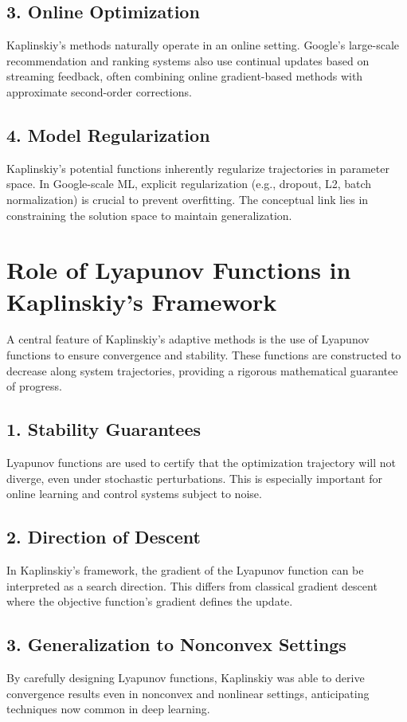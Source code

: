 \documentclass[12pt]{article}
\begin{document}
\subsection*{3. Online Optimization}
Kaplinskiy's methods naturally operate in an online setting. Google’s large-scale recommendation and ranking systems also use continual updates based on streaming feedback, often combining online gradient-based methods with approximate second-order corrections.

\subsection*{4. Model Regularization}
Kaplinskiy's potential functions inherently regularize trajectories in parameter space. In Google-scale ML, explicit regularization (e.g., dropout, L2, batch normalization) is crucial to prevent overfitting. The conceptual link lies in constraining the solution space to maintain generalization.

\section{Role of Lyapunov Functions in Kaplinskiy's Framework}
A central feature of Kaplinskiy's adaptive methods is the use of Lyapunov functions to ensure convergence and stability. These functions are constructed to decrease along system trajectories, providing a rigorous mathematical guarantee of progress.

\subsection*{1. Stability Guarantees}
Lyapunov functions are used to certify that the optimization trajectory will not diverge, even under stochastic perturbations. This is especially important for online learning and control systems subject to noise.

\subsection*{2. Direction of Descent}
In Kaplinskiy’s framework, the gradient of the Lyapunov function can be interpreted as a search direction. This differs from classical gradient descent where the objective function's gradient defines the update.

\subsection*{3. Generalization to Nonconvex Settings}
By carefully designing Lyapunov functions, Kaplinskiy was able to derive convergence results even in nonconvex and nonlinear settings, anticipating techniques now common in deep learning.
\end{document}
